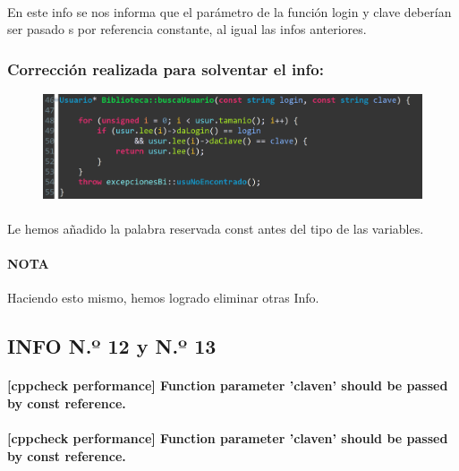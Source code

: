 			\paragraph{}En este info se nos informa que el parámetro de la función login y clave deberían ser pasado s por referencia constante, al igual las infos anteriores.
			
		\subsubsection{Corrección realizada para solventar el info:}
		
			\begin{figure}[H]
				\centering
				\includegraphics[scale=0.55]{img/esteban17.png}
				\label{esteban17}
			\end{figure}
		
			\paragraph{}Le hemos añadido la palabra reservada const antes del tipo de las variables.
			
			\paragraph{NOTA}Haciendo esto mismo, hemos logrado eliminar otras Info.	
			
	\subsection{INFO N.º 12 y N.º 13}
	
		\paragraph{[cppcheck performance] Function parameter 'claven' should be passed by const reference.}
		
		\paragraph{[cppcheck performance] Function parameter 'claven' should be passed by const reference.}
	
